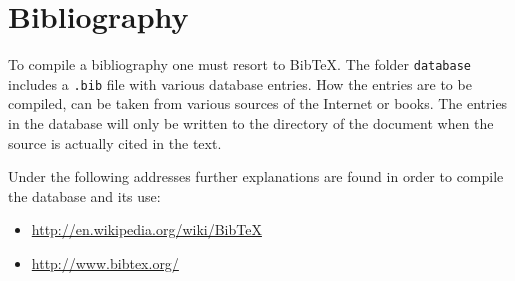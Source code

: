 \section{Bibliography}
\label{sec:instructions_bibliography}

To compile a bibliography one must resort to \gls{BibTeX}. The folder \texttt{database} includes a \texttt{.bib} file with various database entries. How the entries are to be compiled, can be taken from various sources of the Internet or books. The entries in the database will only be written to the directory of the document when the source is actually cited in the text.

Under the following addresses further explanations are found in order to compile the database and its use:

\begin{itemize}
	\item \url{http://en.wikipedia.org/wiki/BibTeX}
	\item \url{http://www.bibtex.org/}
\end{itemize}


